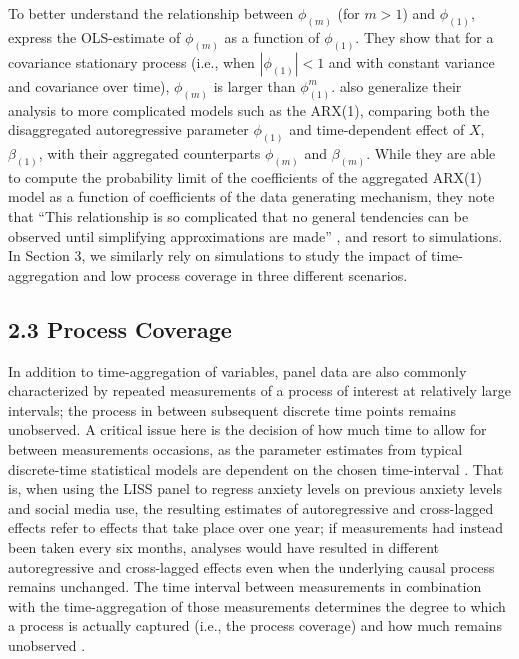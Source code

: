 \documentclass[man]{apa7} %
\begin{document}
To better understand the relationship between $\phi_{(m)}$ (for $m > 1$) and $\phi_{(1)}$, \textcite{hickman_effects_1972} express the OLS-estimate of $\phi_{(m)}$ as a function of $\phi_{(1)}$. They show that for a covariance stationary process (i.e., when $|\phi_{(1)}| < 1$ and with constant variance and covariance over time), $\phi_{(m)}$ is larger than $\phi_{(1)}^{m}$. \textcite{hickman_effects_1972} also generalize their analysis to more complicated models such as the ARX(1), comparing both the disaggregated autoregressive parameter $\phi_{(1)}$ and time-dependent effect of $X$, $\beta_{(1)}$, with their aggregated counterparts $\phi_{(m)}$ and $\beta_{(m)}$. While they are able to compute the probability limit of the coefficients of the aggregated ARX(1) model as a function of coefficients of the data generating mechanism, they note that ``This relationship is so complicated that no general tendencies can be observed until simplifying approximations are made'' \parencite[][p. 689]{amemiya_effect_1972}, and resort to simulations. In Section 3, we similarly rely on simulations to study the impact of time-aggregation and low process coverage in three different scenarios. 

\subsection{2.3 Process Coverage} 
In addition to time-aggregation of variables, panel data are also commonly characterized by repeated measurements of a process of interest at relatively large intervals; the process in between subsequent discrete time points remains unobserved. A critical issue here is the decision of how much time to allow for between measurements occasions, as the parameter estimates from typical discrete-time statistical models are dependent on the chosen time-interval \parencite{gollob_taking_1987}. That is, when using the LISS panel to regress anxiety levels on previous anxiety levels and social media use, the resulting estimates of autoregressive and cross-lagged effects refer to effects that take place over one year; if measurements had instead been taken every six months, analyses would have resulted in different autoregressive and cross-lagged effects even when the underlying causal process remains unchanged. The time interval between measurements in combination with the time-aggregation of those measurements determines the degree to which a process is actually captured (i.e., the process coverage) and how much remains unobserved \parencite{hamaker_within-between_2023}.  
\end{document}
